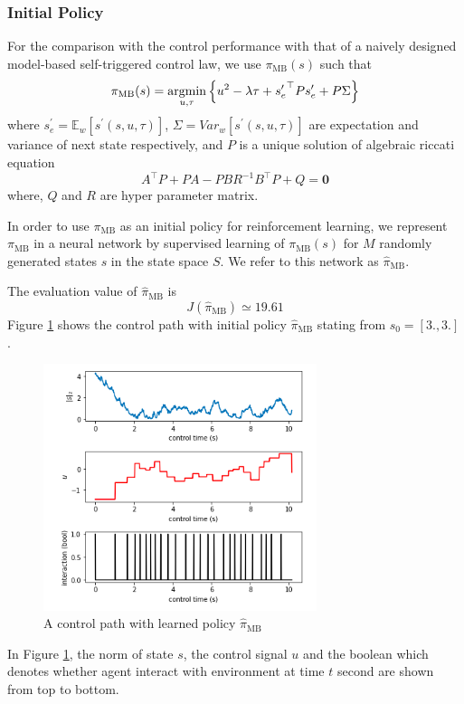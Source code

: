 \documentclass[english, dvipdfmx]{ampmt}             %
\newcommand{\argmin}{\mathop{\rm argmin}\limits}
\newcommand{\expect}{\mathbb{E}}
\begin{document}
\subsubsection{Initial Policy}
For the comparison with the control performance with that of a naively designed model-based self-triggered control law, we use $\pi_{\textrm{MB}}(s)$ such that
\begin{equation}
	\pi_{\textrm{MB}}(s) = \argmin_{u,\tau} \left\{u^2 - \lambda\tau + {s^{\prime}_e}^{\top}Ps^{\prime} _e+ P\Sigma\right\}
\end{equation}
where $s^{\prime}_e=\expect_{w}[s^{\prime}(s,u,\tau)]$, $\Sigma=Var_w[s^{\prime}(s,u,\tau)]$ are  expectation and variance of next state respectively, and $P$ is a unique solution of algebraic riccati equation
\begin{equation}
	A^{\top}P + PA - PBR^{-1}B^{\top}P + Q = \bm{0}
\end{equation}
where, $Q$ and $R$ are hyper parameter matrix.
\par
In order to use $\pi_{\textrm{MB}}$ as an initial policy for reinforcement learning, we represent $\pi_{\textrm{MB}}$ in a neural network by supervised learning of $\pi_{\textrm{MB}}(s)$ for $M$ randomly generated states $s$ in the state space $S$. We refer to this network as $\hat{\pi}_{\textrm{MB}}$.\par
The evaluation value of $\hat{\pi}_{\textrm{MB}}$ is
\begin{equation}
	J(\hat{\pi}_{\textrm{MB}}) \simeq 19.61
\end{equation}
Figure \ref{naiive} shows the control path with initial policy $\hat{\pi}_{\textrm{MB}}$ stating from $s_0 = [3., 3.]$.
\begin{figure}[H]
	\centering
 	\includegraphics[width=8cm]{naiive.png}
 	\caption{A control path with learned policy $\hat{\pi}_{\textrm{MB}}$} \label{naiive}
\end{figure}
In Figure \ref{naiive}, the norm of state $s$, the control signal $u$ and the boolean which denotes whether agent interact with environment at time $t$ second are shown from top to bottom.
\end{document}
